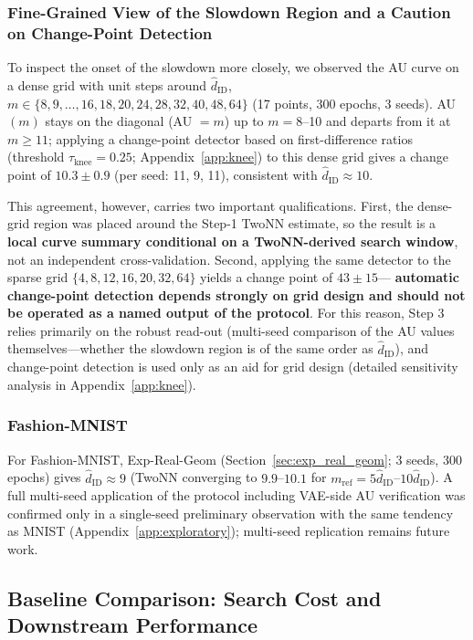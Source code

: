 \documentclass[make,article,submit,pdftex,moreauthors]{Definitions/mdpi}
\newcommand{\hatdID}{\hat{d}_{\mathrm{ID}}}
\begin{document}
\subsubsection{Fine-Grained View of the Slowdown Region and a Caution on Change-Point Detection}\label{sec:exp_mnist_dense}

To inspect the onset of the slowdown more closely, we observed the AU curve
on a dense grid with unit steps around $\hatdID$,
$m \in \{8, 9, \ldots, 16, 18, 20, 24, 28, 32, 40, 48, 64\}$ (17 points,
300 epochs, 3 seeds).
AU$(m)$ stays on the diagonal (AU $= m$) up to $m = 8$--10 and departs from
it at $m \geq 11$; applying a change-point detector based on
first-difference ratios (threshold $\tau_{\mathrm{knee}} = 0.25$;
Appendix~\ref{app:knee}) to this dense grid gives a change point of
$10.3 \pm 0.9$ (per seed: 11, 9, 11), consistent with
$\hatdID \approx 10$.

This agreement, however, carries two important qualifications.
First, the dense-grid region was placed around the Step-1 TwoNN estimate,
so the result is a \textbf{local curve summary conditional on a
TwoNN-derived search window}, not an independent cross-validation.
Second, applying the same detector to the sparse grid
$\{4, 8, 12, 16, 20, 32, 64\}$ yields a change point of $43 \pm 15$---%
\textbf{automatic change-point detection depends strongly on grid design and
should not be operated as a named output of the protocol}.
For this reason, Step 3 relies primarily on the robust read-out
(multi-seed comparison of the AU values themselves---whether the slowdown
region is of the same order as $\hatdID$), and change-point detection is
used only as an aid for grid design (detailed sensitivity analysis in
Appendix~\ref{app:knee}).

\subsubsection{Fashion-MNIST}

For Fashion-MNIST, Exp-Real-Geom (Section~\ref{sec:exp_real_geom}; 3 seeds,
300 epochs) gives $\hatdID \approx 9$ (TwoNN converging to $9.9$--$10.1$
for $m_{\mathrm{ref}} = 5\hatdID$--$10\hatdID$).
A full multi-seed application of the protocol including VAE-side AU
verification was confirmed only in a single-seed preliminary observation
with the same tendency as MNIST (Appendix~\ref{app:exploratory}); multi-seed
replication remains future work.

\subsection{Baseline Comparison: Search Cost and Downstream Performance}\label{sec:exp_downstream}
\end{document}
